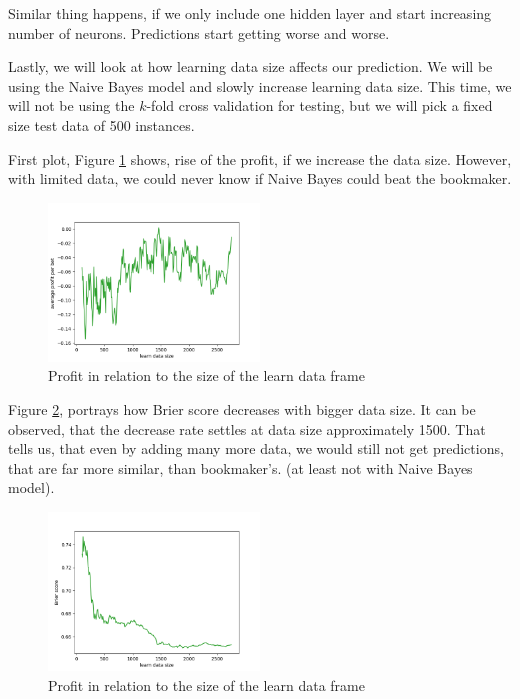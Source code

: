 \documentclass[conference]{IEEEtran}
\begin{document}
Similar thing happens, if we only include one hidden layer and start increasing number
of neurons. Predictions start getting worse and worse.

Lastly, we will look at how learning data size affects our prediction. We will be using the 
Naive Bayes model and slowly increase learning data size. This time, we will not be using 
the $k$-fold cross validation for testing, but we will pick a fixed size test data of 500
instances.

First plot, Figure \ref{data_size_profit} shows, rise of the profit, if we increase the data
size. However, with limited data, we could never know if Naive Bayes could beat the bookmaker.

\begin{figure}[!ht]
\includegraphics[width=0.5\textwidth]{profit-data_size.png}
\caption{Profit in relation to the size of the learn data frame}
\label{data_size_profit}
\end{figure}

Figure \ref{data_size_brier}, portrays how Brier score decreases with bigger data size. It
can be observed, that the decrease rate settles at data size approximately 1500. That tells us,
that even by adding many more data, we would still not get predictions, that are far more similar,
than bookmaker's. (at least not with Naive Bayes model).

\begin{figure}[!ht]
\includegraphics[width=0.5\textwidth]{brier-data_size.png}
\caption{Profit in relation to the size of the learn data frame}
\label{data_size_brier}
\end{figure}
\end{document}
